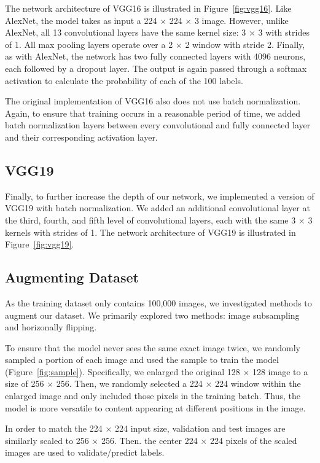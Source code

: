 \documentclass[10pt,twocolumn,letterpaper]{article}
\begin{document}
The network architecture of VGG16 is illustrated in Figure~\ref{fig:vgg16}. Like AlexNet, the model takes as input a 224 $\times$ 224 $\times$ 3 image. However, unlike AlexNet, all 13 convolutional layers have the same kernel size: 3 $\times$ 3 with strides of 1. All max pooling layers operate over a 2 $\times$ 2 window with stride 2. Finally, as with AlexNet, the network has two fully connected layers with 4096 neurons, each followed by a dropout layer. The output is again passed through a softmax activation to calculate the probability of each of the 100 labels.

The original implementation of VGG16 also does not use batch normalization. Again, to ensure that training occurs in a reasonable period of time, we added batch normalization layers between every convolutional and fully connected layer and their corresponding activation layer.

\subsection{VGG19}

Finally, to further increase the depth of our network, we implemented a version of VGG19 with batch normalization. We added an additional convolutional layer at the third, fourth, and fifth level of convolutional layers, each with the same 3 $\times$ 3 kernels with strides of 1. The network architecture of VGG19 is illustrated in Figure~\ref{fig:vgg19}.

\subsection{Augmenting Dataset}

As the training dataset only contains 100,000 images, we investigated methods to augment our dataset. We primarily explored two methods: image subsampling and horizonally flipping.

To ensure that the model never sees the same exact image twice, we randomly sampled a portion of each image and used the sample to train the model (Figure~\ref{fig:sample}). Specifically, we enlarged the original 128 $\times$ 128 image to a size of 256 $\times$ 256. Then, we randomly selected a 224 $\times$ 224 window within the enlarged image and only included those pixels in the training batch. Thus, the model is more versatile to content appearing at different positions in the image.

In order to match the 224 $\times$ 224 input size, validation and test images are similarly scaled to 256 $\times$ 256. Then. the center 224 $\times$ 224 pixels of the scaled images are used to validate/predict labels.
\end{document}
